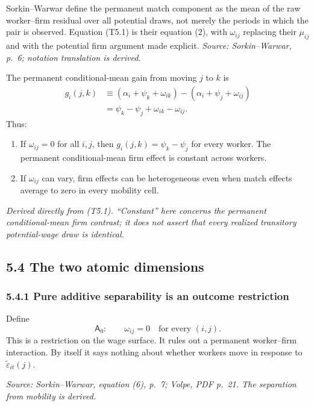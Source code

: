 \documentclass[11pt]{article}
\begin{document}
Sorkin--Warwar define the permanent match component as the mean of the raw
worker--firm residual over all potential draws, not merely the periods in
which the pair is observed.  Equation (T5.1) is their equation (2), with
\(\omega_{ij}\) replacing their \(\mu_{ij}\) and with the potential firm
argument made explicit.
\textit{Source: Sorkin--Warwar, p.\ 6; notation translation is derived.}

The permanent conditional-mean gain from moving \(j\) to \(k\) is
\[
\begin{aligned}
g_i(j,k)
&\equiv
\left(\alpha_i+\psi_k+\omega_{ik}\right)
-\left(\alpha_i+\psi_j+\omega_{ij}\right)\\
&=
\psi_k-\psi_j+\omega_{ik}-\omega_{ij}.
\end{aligned}
\tag{T5.4}
\]
Thus:

\begin{enumerate}
\item If \(\omega_{ij}=0\) for all \(i,j\), then
  \(g_i(j,k)=\psi_k-\psi_j\) for every worker.  The permanent
  conditional-mean firm effect is constant across workers.
\item If \(\omega_{ij}\) can vary, firm effects can be heterogeneous even
  when match effects average to zero in every mobility cell.
\end{enumerate}

\textit{Derived directly from (T5.1).  ``Constant'' here concerns the
permanent conditional-mean firm contrast; it does not assert that every
realized transitory potential-wage draw is identical.}

\subsection{5.4 The two atomic dimensions}

\subsubsection{5.4.1 Pure additive separability is an outcome restriction}

Define
\[
\mathsf A_0:
\qquad
\omega_{ij}=0
\quad\text{for every }(i,j).
\tag{T5.5}
\]
This is a restriction on the wage surface.  It rules out a permanent
worker--firm interaction.  By itself it says nothing about whether workers
move in response to \(\widetilde\varepsilon_{it}(j)\).

\textit{Source: Sorkin--Warwar, equation (6), p.\ 7; Volpe, PDF p.\ 21.
The separation from mobility is derived.}
\end{document}
